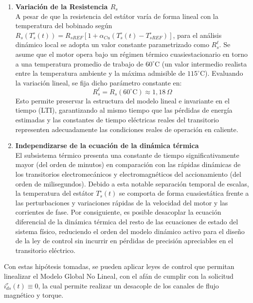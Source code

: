 \documentclass[blue,fullpaper]{ludusofficial}  %
\begin{document}
\begin{enumerate}
    \item \textbf{Variación de la Resistencia \(R_s\)} \\
A pesar de que la resistencia del estátor varía de forma lineal con la temperatura del bobinado según $R_s(T_s^\circ(t)) = R_{sREF}[1 + \alpha_{Cu}(T_s^\circ(t) - T_{sREF}^\circ)]$, para el análisis dinámico local se adopta un valor constante parametrizado como $R_s^\ell$. Se asume que el motor opera bajo un régimen térmico cuasiestacionario en torno a una temperatura promedio de trabajo de $60^\circ\text{C}$ (un valor intermedio realista entre la temperatura ambiente y la máxima admisible de $115^\circ\text{C}$). Evaluando la variación lineal, se fija dicho parámetro constante en:
    \begin{equation*}
        R_s^\ell = R_s(60^\circ\text{C}) \approx 1{,}18\,\Omega
    \end{equation*}
Esto permite preservar la estructura del modelo lineal e invariante en el tiempo (LTI), garantizando al mismo tiempo que las pérdidas de energía estimadas y las constantes de tiempo eléctricas reales del transitorio representen adecuadamente las condiciones reales de operación en caliente.
    
    \item \textbf{Independizarse de la ecuación de la dinámica térmica} \\
El subsistema térmico presenta una constante de tiempo significativamente mayor (del orden de minutos) en comparación con las rápidas dinámicas de los transitorios electromecánicos y electromagnéticos del accionamiento (del orden de milisegundos). Debido a esta notable separación temporal de escalas, la temperatura del estátor $T_s^\circ(t)$ se comporta de forma cuasiestática frente a las perturbaciones y variaciones rápidas de la velocidad del motor y las corrientes de fase. Por consiguiente, es posible desacoplar la ecuación diferencial de la dinámica térmica del resto de las ecuaciones de estado del sistema físico, reduciendo el orden del modelo dinámico activo para el diseño de la ley de control sin incurrir en pérdidas de precisión apreciables en el transitorio eléctrico.
    
\end{enumerate}

Con estas hipótesis tomadas, se pueden aplicar leyes de control que permitan linealizar el Modelo Global No Lineal, con el afán de cumplir con la solicitud $i_{ds}^{r}(t) \equiv 0$, la cual permite realizar un desacople de los canales de flujo magnético y torque.
\end{document}
